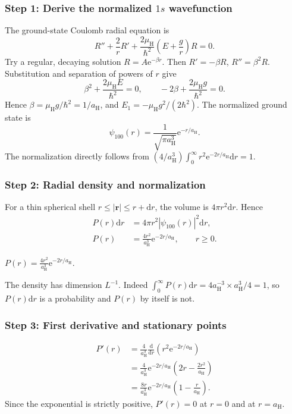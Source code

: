 \documentclass[11pt,a4paper]{article}
\newcommand{\key}[1]{\begin{resultbox}\centering\(\displaystyle #1\)\end{resultbox}}
\newcommand{\dd}{\mathrm{d}}
\newcommand{\ee}{\mathrm{e}}
\newcommand{\aH}{a_{\mathrm H}}
\newcommand{\mH}{\mu_{\mathrm H}}
\begin{document}
\subsubsection*{Step 1: Derive the normalized \texorpdfstring{$1s$}{1s} wavefunction}
The ground-state Coulomb radial equation is
\begin{equation}R''+\frac2rR'+\frac{2\mH}{\hbar^2}\left(E+\frac gr\right)R=0.\end{equation}
Try a regular, decaying solution \(R=A\ee^{-\beta r}\). Then \(R'=-\beta R\), \(R''=\beta^2R\). Substitution and separation of powers of \(r\) give
\begin{equation}\beta^2+\frac{2\mH E}{\hbar^2}=0,\qquad -2\beta+\frac{2\mH g}{\hbar^2}=0.\end{equation}
Hence \(\beta=\mH g/\hbar^2=1/\aH\), and \(E_1=-\mH g^2/(2\hbar^2)\). The normalized ground state is
\begin{equation}\boxed{\psi_{100}(r)=\frac1{\sqrt{\pi\aH^3}}\ee^{-r/\aH}.}\end{equation}
The normalization directly follows from \((4/\aH^3)\int_0^\infty r^2\ee^{-2r/\aH}\dd r=1\).

\subsubsection*{Step 2: Radial density and normalization}
For a thin spherical shell \(r\le |\mathbf r|\le r+\dd r\), the volume is \(4\pi r^2\dd r\). Hence
\begin{align}
P(r)\dd r&=4\pi r^2|\psi_{100}(r)|^2\dd r,\\
P(r)&=\frac{4r^2}{\aH^3}\ee^{-2r/\aH},\qquad r\ge0.
\end{align}
\key{\boxed{P(r)=\frac{4r^2}{\aH^3}\ee^{-2r/\aH}.}}
The density has dimension \(L^{-1}\). Indeed \(\int_0^\infty P(r)\dd r=4\aH^{-3}\times\aH^3/4=1\), so \(P(r)\dd r\) is a probability and \(P(r)\) by itself is not.

\subsubsection*{Step 3: First derivative and stationary points}
\begin{align}
P'(r)&=\frac4{\aH^3}\frac{\dd}{\dd r}\left(r^2\ee^{-2r/\aH}\right)\\
&=\frac4{\aH^3}\ee^{-2r/\aH}\left(2r-\frac{2r^2}{\aH}\right)\\
&=\boxed{\frac{8r}{\aH^3}\ee^{-2r/\aH}\left(1-\frac r{\aH}\right)}.
\end{align}
Since the exponential is strictly positive, \(P'(r)=0\) at \(r=0\) and at \(r=\aH\).
\end{document}
